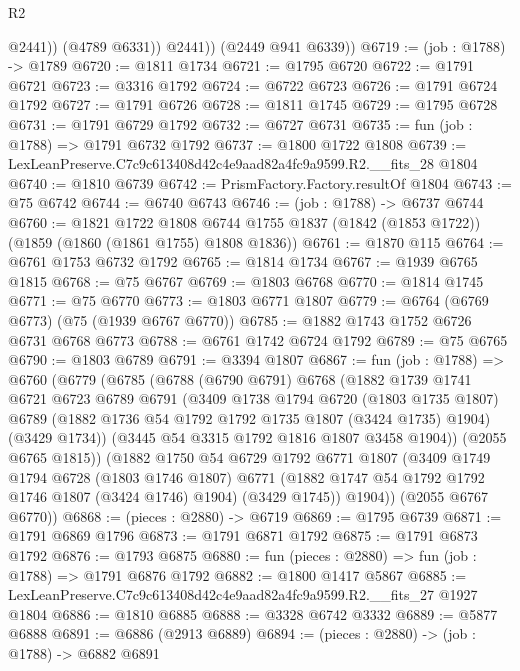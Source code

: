 \begin{lexlean}{R2}
\begin{coremodule}
                @2441))
            (@4789 @6331))
          @2441))
      (@2449 @941 @6339))
@6719 := (job : @1788) -> @1789
@6720 := @1811 @1734
@6721 := @1795 @6720
@6722 := @1791 @6721
@6723 := @3316 @1792
@6724 := @6722 @6723
@6726 := @1791 @6724 @1792
@6727 := @1791 @6726
@6728 := @1811 @1745
@6729 := @1795 @6728
@6731 := @1791 @6729 @1792
@6732 := @6727 @6731
@6735 := fun (job : @1788) => @1791 @6732 @1792
@6737 := @1800 @1722 @1808
@6739 := LexLeanPreserve.C7c9c613408d42c4e9aad82a4fc9a9599.R2.__fits_28 @1804
@6740 := @1810 @6739
@6742 := PrismFactory.Factory.resultOf @1804
@6743 := @75 @6742
@6744 := @6740 @6743
@6746 := (job : @1788) -> @6737 @6744
@6760 := @1821
    @1722
    @1808
    @6744
    @1755
    @1837
    (@1842 (@1853 @1722))
    (@1859 (@1860 (@1861 @1755) @1808 @1836))
@6761 := @1870 @115
@6764 := @6761 @1753 @6732 @1792
@6765 := @1814 @1734
@6767 := @1939 @6765 @1815
@6768 := @75 @6767
@6769 := @1803 @6768
@6770 := @1814 @1745
@6771 := @75 @6770
@6773 := @1803 @6771 @1807
@6779 := @6764 (@6769 @6773) (@75 (@1939 @6767 @6770))
@6785 := @1882 @1743 @1752 @6726 @6731 @6768 @6773
@6788 := @6761 @1742 @6724 @1792
@6789 := @75 @6765
@6790 := @1803 @6789
@6791 := @3394 @1807
@6867 := fun (job : @1788) =>
  @6760
    (@6779
      (@6785
        (@6788
          (@6790 @6791)
          @6768
          (@1882
            @1739
            @1741
            @6721
            @6723
            @6789
            @6791
            (@3409
              @1738
              @1794
              @6720
              (@1803 @1735 @1807)
              @6789
              (@1882 @1736 @54 @1792 @1792 @1735 @1807 (@3424 @1735) @1904)
              (@3429 @1734))
            (@3445 @54 @3315 @1792 @1816 @1807 @3458 @1904))
          (@2055 @6765 @1815))
        (@1882
          @1750
          @54
          @6729
          @1792
          @6771
          @1807
          (@3409
            @1749
            @1794
            @6728
            (@1803 @1746 @1807)
            @6771
            (@1882 @1747 @54 @1792 @1792 @1746 @1807 (@3424 @1746) @1904)
            (@3429 @1745))
          @1904))
      (@2055 @6767 @6770))
@6868 := (pieces : @2880) -> @6719
@6869 := @1795 @6739
@6871 := @1791 @6869 @1796
@6873 := @1791 @6871 @1792
@6875 := @1791 @6873 @1792
@6876 := @1793 @6875
@6880 := fun (pieces : @2880) => fun (job : @1788) => @1791 @6876 @1792
@6882 := @1800 @1417 @5867
@6885 := LexLeanPreserve.C7c9c613408d42c4e9aad82a4fc9a9599.R2.__fits_27 @1927 @1804
@6886 := @1810 @6885
@6888 := @3328 @6742 @3332
@6889 := @5877 @6888
@6891 := @6886 (@2913 @6889)
@6894 := (pieces : @2880) -> (job : @1788) -> @6882 @6891

\end{coremodule}
\end{lexlean}
